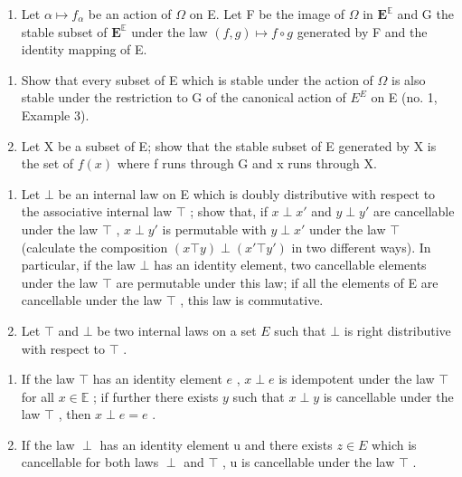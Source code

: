 \BourbakiExercisesSection

\begin{enumerate}
\def\labelenumi{\arabic{enumi}.}
\tightlist
\item
  Let \(\alpha \mapsto f_{\alpha}\) be an action of \(\Omega\) on E. Let F be the image of \(\Omega\) in \(\mathbf{E}^{\mathbb{E}}\) and G the stable subset of \(\mathbf{E}^{\mathbb{E}}\) under the law \((f,g) \mapsto f \circ g\) generated by F and the identity mapping of E.
\end{enumerate}

\begin{enumerate}
\def\labelenumi{(\alph{enumi})}
\item
  Show that every subset of E which is stable under the action of \(\Omega\) is also stable under the restriction to G of the canonical action of \(E^{E}\) on E (no. 1, Example 3).
\item
  Let X be a subset of E; show that the stable subset of E generated by X is the set of \(f(x)\) where f runs through G and x runs through X.
\end{enumerate}

\begin{enumerate}
\def\labelenumi{\arabic{enumi}.}
\setcounter{enumi}{1}
\item
  Let \(\bot\) be an internal law on E which is doubly distributive with respect to the associative internal law \(\top\) ; show that, if \(x \perp x'\) and \(y \perp y'\) are cancellable under the law \(\top\) , \(x \perp y'\) is permutable with \(y \perp x'\) under the law \(\top\) (calculate the composition \((x \top y) \perp (x' \top y')\) in two different ways). In particular, if the law \(\bot\) has an identity element, two cancellable elements under the law \(\top\) are permutable under this law; if all the elements of E are cancellable under the law \(\top\) , this law is commutative.
\item
  Let \(\top\) and \(\bot\) be two internal laws on a set \(E\) such that \(\bot\) is right distributive with respect to \(\top\) .
\end{enumerate}

\begin{enumerate}
\def\labelenumi{(\alph{enumi})}
\item
  If the law \(\top\) has an identity element \(e\) , \(x \perp e\) is idempotent under the law \(\top\) for all \(x \in \mathbb{E}\) ; if further there exists \(y\) such that \(x \perp y\) is cancellable under the law \(\top\) , then \(x \perp e = e\) .
\item
  If the law \(\perp\) has an identity element u and there exists \(z \in E\) which is cancellable for both laws \(\perp\) and \(\top\) , u is cancellable under the law \(\top\) .
\end{enumerate}

